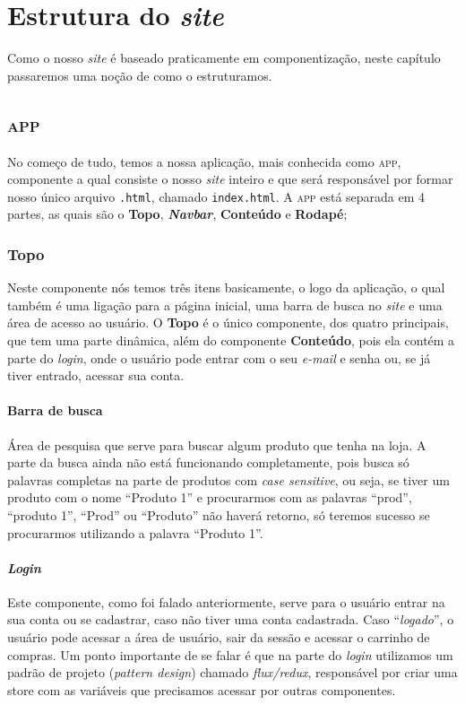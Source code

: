 \chapter{Estrutura do \emph{site}}
Como o nosso \emph{site} é baseado praticamente em componentização, neste
capítulo passaremos uma noção de como o estruturamos.

\section{\textsc{app}}
No começo de tudo, temos a nossa aplicação, mais conhecida como \textsc{app},
componente a qual consiste o nosso \emph{site} inteiro e que será responsável
por formar nosso único arquivo \texttt{.html}, chamado \texttt{index.html}. A
\textsc{app} está separada em 4 partes, as quais são o \textbf{Topo},
\emph{\textbf{Navbar}}, \textbf{Conteúdo} e \textbf{Rodapé};

\subsection{Topo}
Neste componente nós temos três itens basicamente, o logo da aplicação, o qual
também é uma ligação para a página inicial, uma barra de busca no \emph{site} e
uma área de acesso ao usuário. O \textbf{Topo} é o único componente, dos quatro
principais, que tem uma parte dinâmica, além do componente \textbf{Conteúdo},
pois ela contém a parte do \emph{login}, onde o usuário pode entrar com o seu
\emph{e-mail} e senha ou, se já tiver entrado, acessar sua conta.

\subsubsection{Barra de busca}
\label{sub:barra}
Área de pesquisa que serve para buscar algum produto que tenha na loja. A parte
da busca ainda não está funcionando completamente, pois busca só palavras
completas na parte de produtos com \emph{case sensitive}, ou seja, se tiver um
produto com o nome “Produto 1” e procurarmos com as palavras “prod”, “produto
1”, “Prod” ou “Produto” não haverá retorno, só teremos sucesso se procurarmos
utilizando a palavra “Produto 1”.

\subsubsection{\emph{Login}}
Este componente, como foi falado anteriormente, serve para o usuário entrar na
sua conta ou se cadastrar, caso não tiver uma conta cadastrada. Caso
“\emph{logado}”, o usuário pode acessar a área de usuário, sair da sessão e
acessar o carrinho de compras. Um ponto importante de se falar é que na parte do
\emph{login} utilizamos um padrão de projeto (\emph{pattern design}) chamado
\emph{flux/redux}, responsável por criar uma store com as variáveis que
precisamos acessar por outras componentes.

